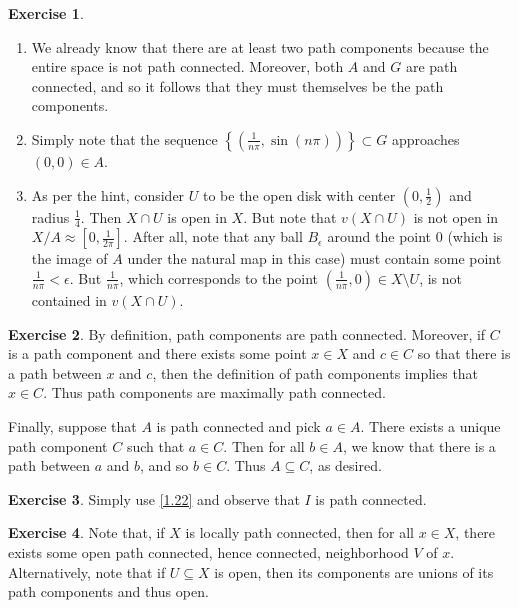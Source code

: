 \documentclass[10pt]{article}
\theoremstyle{definition}
\newtheorem{intex}{Exercise}[section]
\newenvironment{exercise}{\begin{intex}\label{\theintex}}{\end{intex}}
\newcommand\ep{\epsilon}
\begin{document}
\begin{exercise} \leavevmode
\begin{enumerate}
\item We already know that there are at least two path components because the entire space is not path connected. Moreover, both $A$ and $G$ are path connected, and so it follows that they must themselves be the path components. 

\item Simply note that the sequence $\left\{\left(\frac1{n\pi},\sin(n\pi)\right)\right\}\subset G$ approaches $(0,0)\in A$. 

\item As per the hint, consider $U$ to be the open disk with center $(0,\frac12)$ and radius $\frac14$. Then $X\cap U$ is open in $X$. But note that $v(X\cap U)$ is not open in $X/A\approx[0,\frac1{2\pi}]$. After all, note that any ball $B_\ep$ around the point 0 (which is the image of $A$ under the natural map in this case) must contain some point $\frac1{n\pi}<\ep$. But $\frac1{n\pi}$, which corresponds to the point $\left(\frac1{n\pi},0\right)\in X\setminus U$, is not contained in $v(X\cap U)$. 
\end{enumerate} 
\end{exercise} 

\begin{exercise} \leavevmode
By definition, path components are path connected. Moreover, if $C$ is a path component and there exists some point $x\in X$ and $c\in C$ so that there is a path between $x$ and $c$, then the definition of path components implies that $x\in C$. Thus path components are maximally path connected. 

Finally, suppose that $A$ is path connected and pick $a\in A$. There exists a unique path component $C$ such that $a\in C$. Then for all $b\in A$, we know that there is a path between $a$ and $b$, and so $b\in C$. Thus $A\subseteq C$, as desired. 
\end{exercise} 

\begin{exercise} \leavevmode
Simply use \cref{1.22} and observe that $I$ is path connected. 
\end{exercise} 

\begin{exercise} \leavevmode
Note that, if $X$ is locally path connected, then for all $x\in X$, there exists some open path connected, hence connected, neighborhood $V$ of $x$. Alternatively, note that if $U\subseteq X$ is open, then its components are unions of its path components and thus open. 
\end{exercise} 
\end{document}
